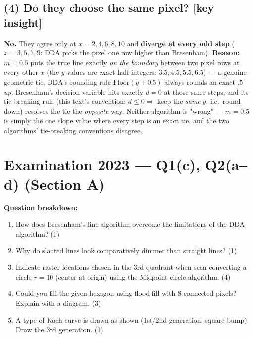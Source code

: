 \documentclass[12pt, a4paper]{article}
\newenvironment{solutionbox}{\begin{mdframed}[style=solutionframe]}{\end{mdframed}}
\newenvironment{answerbox}{\begin{mdframed}[style=answerframe]}{\end{mdframed}}
\begin{document}
\subsection*{(4) Do they choose the same pixel? [key insight]}
\begin{answerbox}
\textbf{No.} They agree only at $x=2,4,6,8,10$ and \textbf{diverge at every odd step} ($x=3,5,7,9$: DDA picks the pixel one row higher than Bresenham). \textbf{Reason:} $m=0.5$ puts the true line exactly \emph{on the boundary} between two pixel rows at every other $x$ (the $y$-values are exact half-integers: $3.5,4.5,5.5,6.5$) --- a genuine geometric tie. DDA's rounding rule $\mathrm{Floor}(y+0.5)$ always rounds an exact $.5$ \emph{up}. Bresenham's decision variable hits exactly $d=0$ at those same steps, and its tie-breaking rule (this text's convention: $d\le0\Rightarrow$ keep the \emph{same} $y$, i.e.\ round down) resolves the tie the \emph{opposite} way. Neither algorithm is "wrong" --- $m=0.5$ is simply the one slope value where every step is an exact tie, and the two algorithms' tie-breaking conventions disagree.
\end{answerbox}

\section{Examination 2023 --- Q1(c), Q2(a--d) (Section A)}
\begin{solutionbox}
\textbf{Question breakdown:}
\begin{enumerate}[noitemsep]
  \item[Q1(c)] How does Bresenham's line algorithm overcome the limitations of the DDA algorithm? (1)
  \item[Q2(a)] Why do slanted lines look comparatively dimmer than straight lines? (1)
  \item[Q2(b)] Indicate raster locations chosen in the 3rd quadrant when scan-converting a circle $r=10$ (center at origin) using the Midpoint circle algorithm. (4)
  \item[Q2(c)] Could you fill the given hexagon using flood-fill with 8-connected pixels? Explain with a diagram. (3)
  \item[Q2(d)] A type of Koch curve is drawn as shown (1st/2nd generation, square bump). Draw the 3rd generation. (1)
\end{enumerate}
\end{solutionbox}
\end{document}
